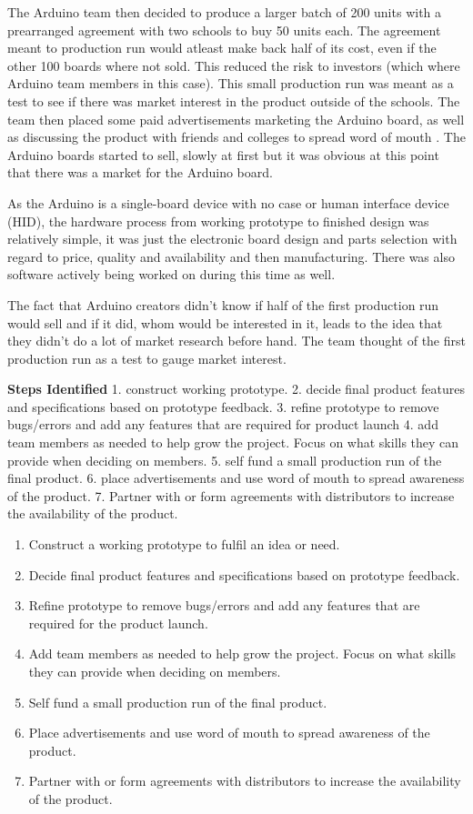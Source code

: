 The Arduino team then decided to produce a larger batch of 200 units with a prearranged agreement with two schools to buy 50 units each. The agreement meant to production run would atleast make back half of its cost, even if the other 100 boards where not sold. This reduced the risk to investors (which where Arduino team members in this case). This small production run was meant as a test to see if there was market interest in the product outside of the schools. The team then placed some paid advertisements marketing the Arduino board, as well as discussing the product with friends and colleges to spread word of mouth \cite{RN111}. The Arduino boards started to sell, slowly at first but it was obvious at this point that there was a market for the Arduino board.

As the Arduino is a single-board device with no case or human interface device (HID), the  hardware process from working prototype to finished design was relatively simple, it was just the electronic board design and parts selection with regard to price, quality and availability and then manufacturing. There was also software actively being worked on during this time as well.

The fact that Arduino creators didn't know if half of the first production run would sell and if it did, whom would be interested in it, leads to the idea that they didn't do a lot of market research before hand. The team thought of the first production run as a test to gauge market interest.

\textbf{Steps Identified}
1. construct working prototype.
2. decide final product features and specifications based on prototype feedback.
3. refine prototype to remove bugs/errors and add any features that are required for product launch
4. add team members as needed to help grow the project. Focus on what skills they can provide when deciding on members.
5. self fund a small production run of the final product.
6. place advertisements and use word of mouth to spread awareness of the product.
7. Partner with or form agreements with distributors to increase the availability of the product.
  
  
\begin{enumerate}
\item Construct a working prototype to fulfil an idea or need.
\item Decide final product features and specifications based on prototype feedback.
\item Refine prototype to remove bugs/errors and add any features that are required for the product launch.
\item Add team members as needed to help grow the project. Focus on what skills they can provide when deciding on members.
\item Self fund a small production run of the final product.
\item Place advertisements and use word of mouth to spread awareness of the product.
\item Partner with or form agreements with distributors to increase the availability of the product.
\end{enumerate} 


